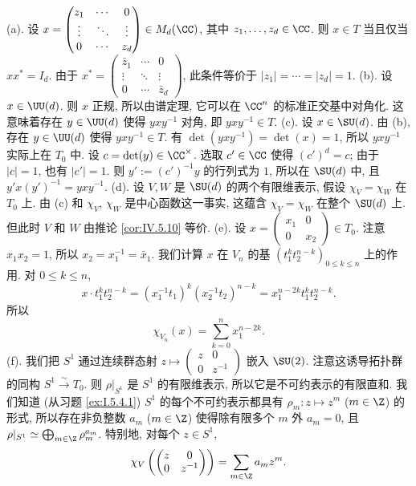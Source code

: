 \begin{solution}
(a). 设 $x = \begin{pmatrix} z_1 & \cdots & 0 \\ \vdots & \ddots & \vdots \\ 0 & \cdots & z_d \end{pmatrix} \in M_d(\CC)$, 其中 $z_1, \ldots, z_d \in \CC$. 则 $x \in T$ 当且仅当 $xx^* = I_d$. 由于 $x^* = \begin{pmatrix} \bar{z}_1 & \cdots & 0 \\ \vdots & \ddots & \vdots \\ 0 & \cdots & \bar{z}_d \end{pmatrix}$, 此条件等价于 $|z_1| = \cdots = |z_d| = 1$.
(b). 设 $x \in \UU(d)$. 则 $x$ 正规, 所以由谱定理, 它可以在 $\CC^n$ 的标准正交基中对角化. 这意味着存在 $y \in \UU(d)$ 使得 $yxy^{-1}$ 对角, 即 $yxy^{-1} \in T$.
(c). 设 $x \in \SU(d)$. 由 (b), 存在 $y \in \UU(d)$ 使得 $yxy^{-1} \in T$. 有 $\det(yxy^{-1}) = \det(x) = 1$, 所以 $yxy^{-1}$ 实际上在 $T_0$ 中. 设 $c = \det(y) \in \CC^{\times}$. 选取 $c' \in \CC$ 使得 $(c')^d = c$; 由于 $|c| = 1$, 也有 $|c'| = 1$. 则 $y' := (c')^{-1}y$ 的行列式为 $1$, 所以在 $\SU(d)$ 中, 且 $y'x(y')^{-1} = yxy^{-1}$.
(d). 设 $V, W$ 是 $\SU(d)$ 的两个有限维表示, 假设 $\chi_V = \chi_W$ 在 $T_0$ 上. 由 (c) 和 $\chi_V$, $\chi_W$ 是中心函数这一事实, 这蕴含 $\chi_V = \chi_W$ 在整个 $\SU(d)$ 上. 但此时 $V$ 和 $W$ 由推论 \ref{cor:IV.5.10} 等价.
(e). 设 $x = \begin{pmatrix} x_1 & 0 \\ 0 & x_2 \end{pmatrix} \in T_0$. 注意 $x_1x_2 = 1$, 所以 $x_2 = x_1^{-1} = \bar{x}_1$. 我们计算 $x$ 在 $V_n$ 的基 $(t_1^kt_2^{n-k})_{0 \leq k \leq n}$ 上的作用. 对 $0 \leq k \leq n$,
\[
x \cdot t_1^kt_2^{n-k} = (x_1^{-1}t_1)^k(x_2^{-1}t_2)^{n-k} = x_1^{n-2k}t_1^kt_2^{n-k}.
\]
所以
\[
\chi_{V_n}(x) = \sum_{k=0}^n x_1^{n-2k}.
\]
(f). 我们把 $S^1$ 通过连续群态射 $z \longmapsto \begin{pmatrix} z & 0 \\ 0 & z^{-1} \end{pmatrix}$ 嵌入 $\SU(2)$. 注意这诱导拓扑群的同构 $S^1 \xrightarrow{\sim} T_0$. 则 $\rho|_{S^1}$ 是 $S^1$ 的有限维表示, 所以它是不可约表示的有限直和. 我们知道 (从习题 \ref{ex:I.5.4.1}) $S^1$ 的每个不可约表示都具有 $\rho_m \colon z \longmapsto z^m$ ($m \in \Z$) 的形式, 所以存在非负整数 $a_m$ ($m \in \Z$) 使得除有限多个 $m$ 外 $a_m = 0$, 且 $\rho|_{S^1} \simeq \bigoplus_{m \in \Z}\rho_m^{a_m}$. 特别地, 对每个 $z \in S^1$,
\[
\chi_V\left(\begin{pmatrix} z & 0 \\ 0 & z^{-1} \end{pmatrix}\right) = \sum_{m \in \Z}a_mz^m.
\]
\end{solution}
